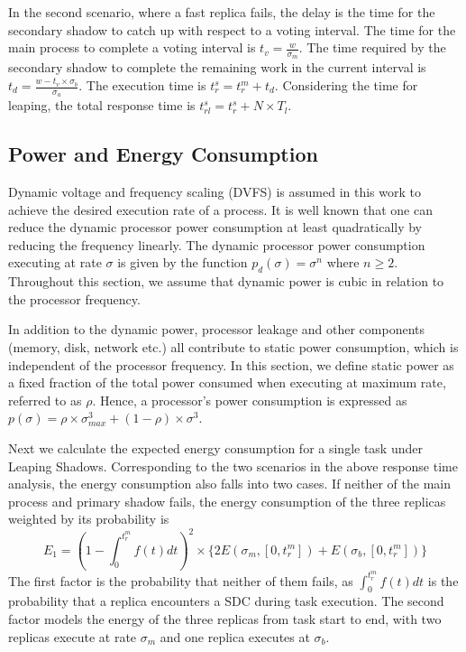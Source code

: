 In the second scenario, 
where a fast replica fails, the delay is the time for the secondary shadow to catch up with respect to a voting interval. The time for the main process to complete a voting interval is $t_v = \frac{w}{\sigma_m}$. The time required by the secondary shadow to complete the remaining work in the current interval is $t_d = \frac{w - t_v\times \sigma_b}{\sigma_a}$. The execution time is $t_r^s = t_r^m + t_d$. Considering the time for leaping, the total response time is $t_{rl}^s=t_r^s + N \times T_l$.


\subsection{Power and Energy Consumption}

Dynamic voltage and frequency scaling
(DVFS) is assumed in this work to achieve the desired execution rate of a process. It
is well known that one can reduce the dynamic processor power consumption at
least quadratically by reducing the frequency linearly. The
dynamic processor power consumption executing at rate
$\sigma$ is given by the function $p_d(\sigma)=\sigma^n$ where $n \ge
2$. Throughout this section, we assume that dynamic power is cubic in relation to the processor frequency.

In addition to the dynamic power, processor leakage and other components
(memory, disk, network etc.) all contribute to static power
consumption, which is independent of the processor frequency. In this section, we
define static power as a fixed fraction of the total power consumed
when executing at maximum rate, referred to as $\rho$. Hence, a processor's
power consumption is expressed as
$p(\sigma)=\rho \times \sigma_{max}^3 + (1-\rho)\times \sigma^3$.

Next we calculate the expected energy consumption for a single task under Leaping Shadows. 
Corresponding to the two scenarios in the above response time analysis, the energy consumption also falls into two cases. 
If neither of the main process and primary shadow fails, the energy consumption of the three replicas weighted by its probability is
\begin{equation}
E_1 =  (1 - \int_{0}^{t_r^m} f(t)dt)^2  \times 
       \{2E(\sigma_m, [0, t_r^m])+E(\sigma_b, [0, t_r^m])\}
\end{equation}
The first factor is the probability that neither of them fails, as $\int_{0}^{t_r^m} f(t)dt$ is the probability that a replica encounters a SDC during task execution. The second factor models the energy of the three replicas from task start to end, with two replicas execute at rate $\sigma_m$ and one replica executes at $\sigma_b$.

